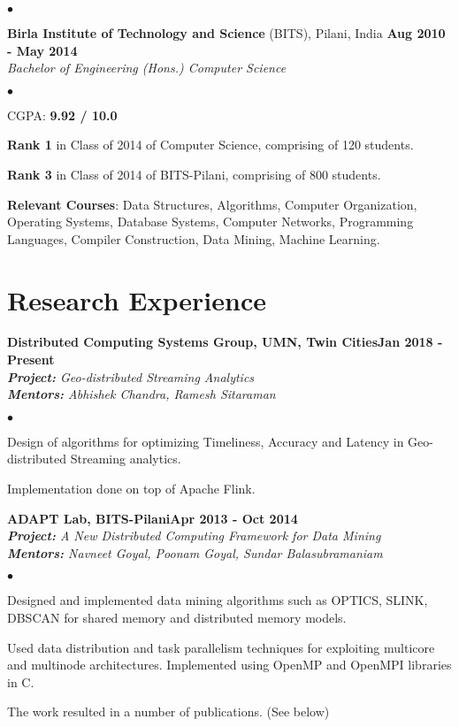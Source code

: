 \documentclass[margin,line]{res}
\newenvironment{list2}{
  \begin{list}{$\bullet$}{%
      \setlength{\itemsep}{0in}
      \setlength{\parsep}{0in} \setlength{\parskip}{0in}
      \setlength{\topsep}{0in} \setlength{\partopsep}{0in} 
      \setlength{\leftmargin}{0.2in}}}{\end{list}}
\begin{document}
\begin{resume}
\begin{list2}
\end{list2}
{\bf Birla Institute of Technology and Science} (BITS), Pilani, India \hfill {\bf {Aug 2010 - May 2014}}\\
{\em Bachelor of Engineering (Hons.) Computer Science }
\vspace*{.3cm}
\begin{list2}
\item CGPA:  {\bf {9.92 / 10.0}}
\item {\bf Rank 1} in Class of 2014 of Computer Science, comprising of 120 students. 
\item {\bf Rank 3} in Class of 2014 of BITS-Pilani, comprising of 800 students.
\item {\bf Relevant Courses}: Data Structures, Algorithms, Computer Organization, Operating Systems, Database Systems, Computer Networks, Programming Languages, Compiler Construction, Data Mining, Machine Learning.

\end{list2}


\section{\sc Research Experience}

{\bf Distributed Computing Systems Group, UMN, Twin Cities}\hfill {\bf Jan 2018 - Present}\\
{\em {\bf Project:} Geo-distributed Streaming Analytics} \\
{\em {\bf Mentors:} Abhishek Chandra, Ramesh Sitaraman}
\vspace{.3cm}
\begin{list2}
	\item Design of algorithms for optimizing Timeliness, Accuracy and Latency in Geo-distributed Streaming analytics.
	\item Implementation done on top of Apache Flink.
\end{list2}

{\bf ADAPT Lab, BITS-Pilani}\hfill {\bf Apr 2013 - Oct 2014}\\
{\em {\bf Project:} A New Distributed Computing Framework for Data Mining} \\
{\em {\bf Mentors:} Navneet Goyal, Poonam Goyal, Sundar Balasubramaniam}
\vspace{.3cm}
\begin{list2}
\item Designed and implemented data mining algorithms such as OPTICS, SLINK, DBSCAN for shared memory and
distributed memory models.
\item Used data distribution and task parallelism techniques for exploiting multicore and multinode
architectures. Implemented using OpenMP and OpenMPI libraries in C.
\item The work resulted in a number of publications. (See below)
\end{list2}


\end{resume}
\end{document}
